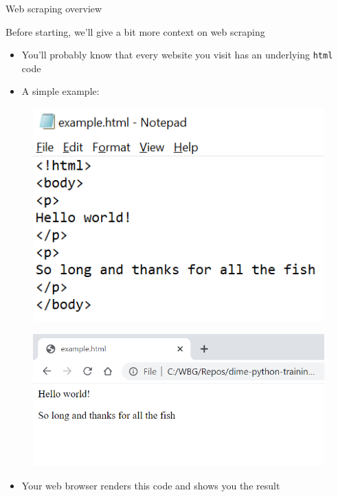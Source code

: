 \documentclass[aspectratio=169]{beamer}
\begin{document}
\begin{frame}{Web scraping overview}

	Before starting, we'll give a bit more context on web scraping	

	\begin{itemize}
		\item You'll probably know that every website you visit has an underlying \texttt{html} code
		\item A simple example:
	\end{itemize}

	\begin{multicols}{2}

		\begin{figure}
			\centering
			\includegraphics[width=0.7\linewidth]{img/html_example.png}
		\end{figure}
		\begin{figure}
			\centering
			\includegraphics[width=\linewidth]{img/html_example_rendered.png}
		\end{figure}

	\end{multicols}

	\begin{itemize}
		\item Your web browser renders this code and shows you the result 
	\end{itemize}

\end{frame}
\end{document}
